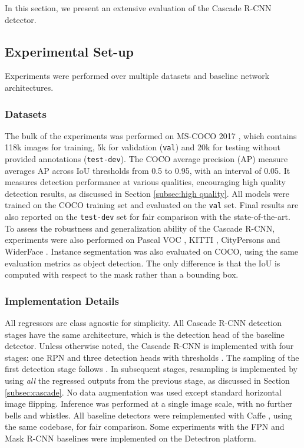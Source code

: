 \documentclass[10pt,journal,compsoc]{IEEEtran}
\begin{document}
In this section, we present an extensive evaluation of the Cascade R-CNN
detector.

\subsection{Experimental Set-up}

Experiments were performed over multiple datasets and baseline network
architectures.

\subsubsection{Datasets}

The bulk of the experiments was performed on MS-COCO
2017 \cite{DBLP:conf/eccv/LinMBHPRDZ14}, which contains 118k images
for training, 5k for validation (\texttt{val}) and 20k for testing
without provided annotations (\texttt{test-dev}). The COCO average
precision (AP) measure averages AP across IoU thresholds from 0.5 to 0.95,
with an interval of 0.05. It measures detection performance
at various qualities, encouraging high quality detection results, as
discussed in Section \ref{subsec:high quality}. All models were trained on
the COCO training set and evaluated on the \texttt{val} set.
Final results are also reported on the \texttt{test-dev} set for fair
comparison with the state-of-the-art. To assess the robustness
and generalization ability of the Cascade R-CNN, experiments were also
performed on Pascal VOC \cite{DBLP:journals/ijcv/EveringhamGWWZ10},
KITTI \cite{DBLP:conf/cvpr/GeigerLU12},
CityPersons \cite{DBLP:conf/cvpr/ZhangBS17} and
WiderFace \cite{DBLP:conf/cvpr/YangLLT16}. Instance
segmentation was also evaluated on COCO, using the same evaluation metrics
as object detection. The only difference is that the IoU is computed with
respect to the mask rather than a bounding box.


\subsubsection{Implementation Details}

All regressors are class agnostic for simplicity. All Cascade R-CNN
detection stages have the same architecture, which is the detection head of
the baseline detector. Unless otherwise noted, the Cascade R-CNN is
implemented with four stages: one RPN and three detection heads with
thresholds . The sampling of the first detection stage
follows \cite{DBLP:conf/iccv/Girshick15,DBLP:conf/nips/RenHGS15}. In
subsequent stages, resampling is implemented by using \textit{all}
the regressed outputs from the previous stage, as discussed in
Section \ref{subsec:cascade}. No data augmentation was used except standard horizontal image flipping. Inference was performed at a single image
scale, with no further bells and whistles. All baseline detectors were
reimplemented with Caffe \cite{DBLP:conf/mm/JiaSDKLGGD14}, using
the same codebase, for fair comparison. Some experiments with
the FPN and Mask R-CNN baselines were implemented on the Detectron platform.
\end{document}

